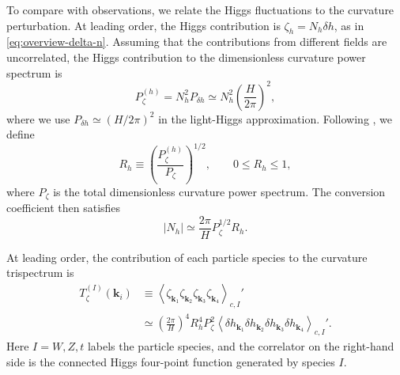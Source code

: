 \documentclass[a4paper,12pt]{article}
\def\mb{\mathbf}
\begin{document}
To compare with observations, we relate the Higgs fluctuations to the curvature perturbation.
At leading order, the Higgs contribution is $\zeta_h=N_h\delta h$, as in \eqref{eq:overview-delta-n}.
Assuming that the contributions from different fields are uncorrelated, the Higgs contribution to the dimensionless curvature power spectrum is
\begin{equation}
    P_\zeta^{(h)}=N_h^2P_{\delta h}
    \simeq N_h^2\left(\frac{H}{2\pi}\right)^2,
    \label{eq:phenomenology-higgs-power}
\end{equation}
where we use $P_{\delta h}\simeq(H/2\pi)^2$ in the light-Higgs approximation.
Following \cite{lu_cosmological_2020}, we define
\begin{equation}
    R_h\equiv\left(\frac{P_\zeta^{(h)}}{P_\zeta}\right)^{1/2},
    \qquad 0\leq R_h\leq1,
    \label{eq:phenomenology-higgs-fraction}
\end{equation}
where $P_\zeta$ is the total dimensionless curvature power spectrum.
The conversion coefficient then satisfies
\begin{equation}
    |N_h|\simeq\frac{2\pi}{H}P_\zeta^{1/2}R_h.
    \label{eq:phenomenology-Nh}
\end{equation}

At leading order, the contribution of each particle species to the curvature trispectrum is
\begin{equation}
    \begin{aligned}
        T_\zeta^{(I)}(\mb k_i)
        &\equiv\left\langle\zeta_{\mb k_1}\zeta_{\mb k_2}
        \zeta_{\mb k_3}\zeta_{\mb k_4}\right\rangle_{c,I}'\\
        &\simeq\left(\frac{2\pi}{H}\right)^4R_h^4P_\zeta^2
        \left\langle\delta h_{\mb k_1}\delta h_{\mb k_2}
        \delta h_{\mb k_3}\delta h_{\mb k_4}\right\rangle_{c,I}'.
    \end{aligned}
    \label{eq:phenomenology-species-trispectrum}
\end{equation}
Here $I=W,Z,t$ labels the particle species, and the correlator on the right-hand side is the connected Higgs four-point function generated by species $I$.
\end{document}
